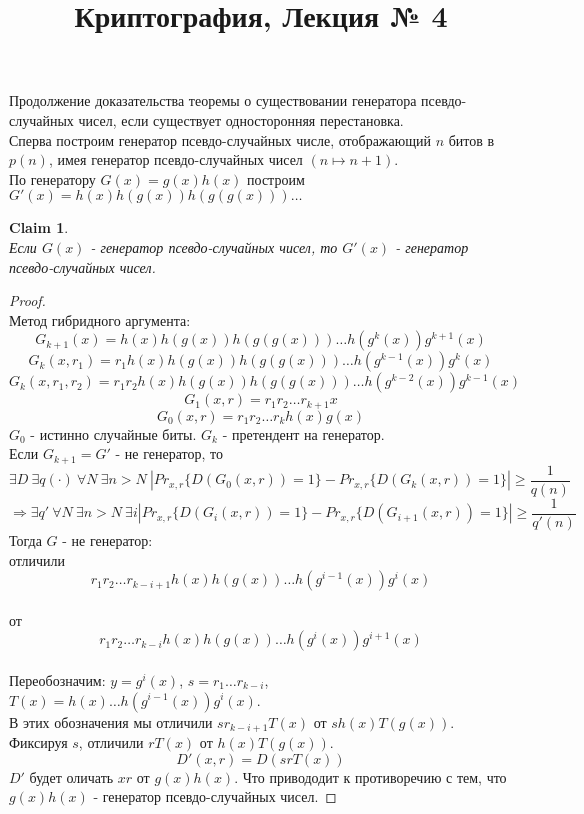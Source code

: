 \documentclass[a4paper]{article}
\title{Криптография, Лекция № 4}
\theoremstyle{definition}
\theoremstyle{plain}
\newtheorem{claim}{Claim}
\begin{document}
\maketitle

\noindent Продолжение доказательства теоремы о существовании генератора псевдо-случайных
чисел, если существует односторонняя перестановка.~\\

\noindent Сперва построим генератор псевдо-случайных числе, отображающий $n$ битов в $p(n)$, имея
генератор псевдо-случайных чисел $(n \mapsto n + 1)$.~\\

\noindent По генератору $G(x) = g(x)h(x)$ построим $G'(x) = h(x)h(g(x))h(g(g(x)))\ldots$

\begin{claim}~\\
	Если $G(x)$ - генератор псевдо-случайных чисел, то $G'(x)$ - генератор псевдо-случайных чисел.
\end{claim}

\begin{proof}~\\
	Метод гибридного аргумента:
	$$
		G_{k + 1}(x) = h(x)h(g(x))h(g(g(x)))\ldots h(g^k(x))g^{k + 1}(x)	
	$$
	$$
		G_k(x, r_1) = r_1h(x)h(g(x))h(g(g(x)))\ldots h(g^{k - 1}(x))g^{k}(x)	
	$$
	$$
		G_k(x, r_1, r_2) = r_1 r_2 h(x)h(g(x))h(g(g(x)))\ldots h(g^{k - 2}(x))g^{k - 1}(x)	
	$$
	$$
		G_1(x, r) = r_1 r_2 \ldots r_{k + 1} x	
	$$
	$$
		G_0(x, r) = r_1 r_2 \ldots r_{k} h(x)g(x)	
	$$
	$G_0$ - истинно случайные биты. $G_k$ - претендент на генератор.~\\
	
	\noindent Если $G_{k + 1} = G'$ - не генератор, то 
	$$
		\exists D\ \exists q(\cdot)\ \forall N\ \exists n > N\ |Pr_{x, r}\{D(G_0(x, r)) = 1\} - Pr_{x, r}\{D(G_k(x, r)) = 1\}| \ge \frac{1}{q(n)}	
	$$
	$$
		\Rightarrow \exists q'\ \forall N\ \exists n > N\ \exists i |Pr_{x, r}\{D(G_i(x, r)) = 1\} - Pr_{x, r}\{D(G_{i + 1}(x, r)) = 1\}| \ge \frac{1}{q'(n)}
	$$
	Тогда $G$ - не генератор:~\\
	отличили $$r_1r_2\ldots r_{k - i + 1}h(x)h(g(x))\ldots h(g^{i - 1}(x))g^i(x)$$~\\
	от $$r_1r_2\ldots r_{k - i}h(x)h(g(x))\ldots h(g^{i}(x))g^{i + 1}(x)$$~\\
	
	\noindent Переобозначим: $y = g^i(x)$, $s = r_1\ldots r_{k - i}$,
	$T(x) = h(x)\ldots h(g^{i - 1}(x))g^i(x)$.~\\
	
	\noindent В этих обозначения мы отличили $sr_{k - i + 1}T(x)$ от $sh(x)T(g(x))$.~\\
	
	\noindent Фиксируя $s$, отличили $rT(x)$ от $h(x)T(g(x))$.
	$$
		D'(x, r) = D(s r T(x))	
	$$
	$D'$ будет оличать $xr$ от $g(x)h(x)$. Что привододит к противоречию с тем, что $g(x)h(x)$ - генератор
	псевдо-случайных чисел.
\end{proof}
\end{document}
